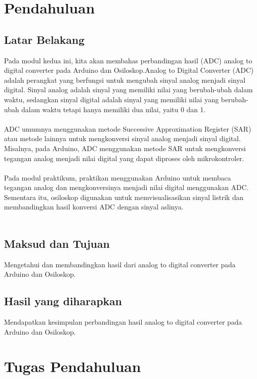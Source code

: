 \section{Pendahuluan}
\subsection{Latar Belakang}
Pada modul kedua ini, kita akan membahas perbandingan hasil (ADC) analog to digital converter pada Arduino dan Osiloskop.Analog to Digital Converter (ADC) adalah perangkat yang berfungsi untuk mengubah sinyal analog menjadi sinyal digital. 
Sinyal analog adalah sinyal yang memiliki nilai yang berubah-ubah dalam waktu, sedangkan sinyal digital adalah sinyal yang memiliki nilai yang berubah-ubah dalam waktu tetapi hanya memiliki dua nilai, yaitu 0 dan 1.
\\\\
ADC umumnya menggunakan metode Successive Approximation Register (SAR) atau metode lainnya untuk mengkonversi sinyal analog menjadi sinyal digital. 
Misalnya, pada Arduino, ADC menggunakan metode SAR untuk mengkonversi tegangan analog menjadi nilai digital yang dapat diproses oleh mikrokontroler.
\\\\
Pada modul praktikum, praktikan menggunakan Arduino untuk membaca tegangan analog dan mengkonversinya menjadi nilai digital menggunakan ADC. 
Sementara itu, osiloskop digunakan untuk memvisualisasikan sinyal listrik dan membandingkan hasil konversi ADC dengan sinyal aslinya.
\\\\

\subsection{Maksud dan Tujuan}
Mengetahui dan membandingkan hasil dari analog to digital converter pada Arduino dan Osiloskop.

\subsection{Hasil yang diharapkan}
Mendapatkan kesimpulan perbandingan hasil analog to digital converter pada Arduino dan Osiloskop.
\section{Tugas Pendahuluan}


